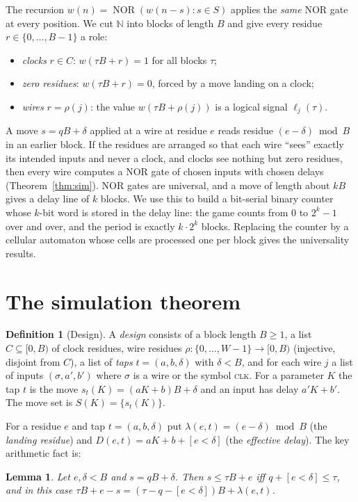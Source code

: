 \documentclass[11pt]{article}
\newtheorem{lemma}[theorem]{Lemma}
\theoremstyle{definition}
\newtheorem{definition}[theorem]{Definition}
\newcommand{\N}{\mathbb{N}}
\newcommand{\NOR}{\operatorname{NOR}}
\begin{document}
The recursion $w(n)=\NOR(w(n-s):s\in S)$ applies the \emph{same} NOR gate at every position.  We
cut $\N$ into blocks of length $B$ and give every residue $r\in\{0,\dots,B-1\}$ a role:
\begin{itemize}
\item \emph{clocks} $r\in C$: $w(\tau B+r)=1$ for all blocks $\tau$;
\item \emph{zero residues}: $w(\tau B+r)=0$, forced by a move landing on a clock;
\item \emph{wires} $r=\rho(j)$: the value $w(\tau B+\rho(j))$ is a logical signal $\ell_j(\tau)$.
\end{itemize}
A move $s=qB+\delta$ applied at a wire at residue $e$ reads residue $(e-\delta)\bmod B$ in an earlier
block.  If the residues are arranged so that each wire ``sees'' exactly its intended inputs and never a
clock, and clocks see nothing but zero residues, then every wire computes a NOR gate of chosen
inputs with chosen delays (Theorem~\ref{thm:sim}).  NOR gates are universal, and a move of length
about $kB$ gives a delay line of $k$ blocks.  We use this to build a bit-serial binary counter
whose $k$-bit word is stored in the delay line: the game counts from $0$ to $2^k-1$ over and over,
and the period is exactly $k\cdot 2^k$ blocks.  Replacing the counter by a cellular automaton whose
cells are processed one per block gives the universality results.


\section{The simulation theorem}\label{sec:sim}

\begin{definition}[Design]
A \emph{design} consists of a block length $B\ge 1$, a list $C\subseteq[0,B)$ of clock residues,
wire residues $\rho:\{0,\dots,W-1\}\to[0,B)$ (injective, disjoint from $C$), a list of \emph{taps}
$t=(a,b,\delta)$ with $\delta<B$, and for each wire $j$ a list of inputs $(\sigma,a',b')$ where
$\sigma$ is a wire or the symbol \textsc{clk}.  For a parameter $K$ the tap $t$ is the move
$s_t(K)=(aK+b)B+\delta$ and an input has delay $a'K+b'$.  The move set is $S(K)=\{s_t(K)\}$.
\end{definition}

For a residue $e$ and tap $t=(a,b,\delta)$ put $\lambda(e,t)=(e-\delta)\bmod B$ (the \emph{landing
residue}) and $D(e,t)=aK+b+[e<\delta]$ (the \emph{effective delay}).  The key arithmetic fact is:

\begin{lemma}\label{lem:arith}
Let $e,\delta<B$ and $s=qB+\delta$.  Then $s\le \tau B+e$ iff $q+[e<\delta]\le\tau$, and in this
case $\tau B+e-s=(\tau-q-[e<\delta])B+\lambda(e,t)$.
\end{lemma}
\end{document}
